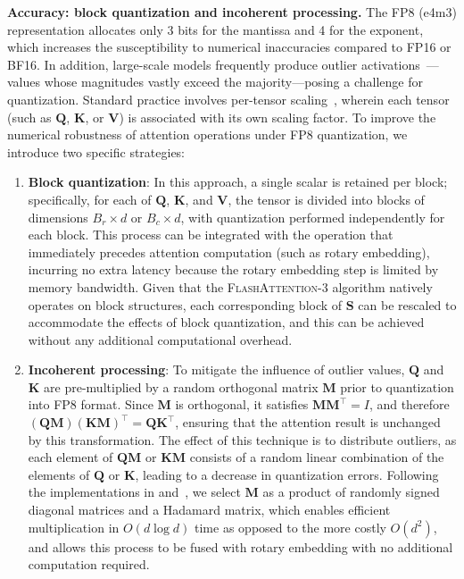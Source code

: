 \begin{enumerate}
\begin{algorithm}[H]
\begin{algorithmic}[1]
\textbf{Accuracy: block quantization and incoherent processing.} The FP8 (e4m3) representation allocates only 3 bits for the mantissa and 4 for the exponent, which increases the susceptibility to numerical inaccuracies compared to FP16 or BF16. In addition, large-scale models frequently produce outlier activations~\citep{dettmers2208llm, sun2024massive}—values whose magnitudes vastly exceed the majority—posing a challenge for quantization. Standard practice involves per-tensor scaling~\citep{micikevicius2022fp8}, wherein each tensor (such as $\mathbf{Q}$, $\mathbf{K}$, or $\mathbf{V}$) is associated with its own scaling factor. To improve the numerical robustness of attention operations under FP8 quantization, we introduce two specific strategies:

\begin{enumerate}

\item \textbf{Block quantization}: In this approach, a single scalar is retained per block; specifically, for each of $\mathbf{Q}$, $\mathbf{K}$, and $\mathbf{V}$, the tensor is divided into blocks of dimensions $B_r \times d$ or $B_c \times d$, with quantization performed independently for each block. This process can be integrated with the operation that immediately precedes attention computation (such as rotary embedding), incurring no extra latency because the rotary embedding step is limited by memory bandwidth. Given that the \textsc{FlashAttention-3} algorithm natively operates on block structures, each corresponding block of
  $\mathbf{S}$ can be rescaled to accommodate the effects of block quantization, and this can be achieved without any additional computational overhead.

\item \textbf{Incoherent processing}: To mitigate the influence of outlier values, $\mathbf{Q}$ and $\mathbf{K}$ are pre-multiplied by a random orthogonal matrix $\mathbf{M}$ prior to quantization into FP8 format. Since $\mathbf{M}$ is orthogonal, it satisfies $\mathbf{M} \mathbf{M}^\top = I$, and therefore $(\mathbf{Q} \mathbf{M})(\mathbf{K} \mathbf{M})^\top = \mathbf{Q}\mathbf{K}^\top$, ensuring that the attention result is unchanged by this transformation. The effect of this technique is to distribute outliers, as each element of $\mathbf{Q}\mathbf{M}$ or $\mathbf{K}\mathbf{M}$ consists of a random linear combination of the elements of $\mathbf{Q}$ or $\mathbf{K}$, leading to a decrease in quantization errors. Following the implementations in \citet{chee2024quip} and~\citet{tseng2024quip}, we select $\mathbf{M}$ as a product of randomly signed diagonal matrices and a Hadamard matrix, which enables efficient multiplication in $O(d \log d)$ time as opposed to the more costly $O(d^2)$, and allows this process to be fused with rotary embedding with no additional computation required.
\end{enumerate}


\end{algorithmic}
\end{algorithm}
\end{enumerate}
